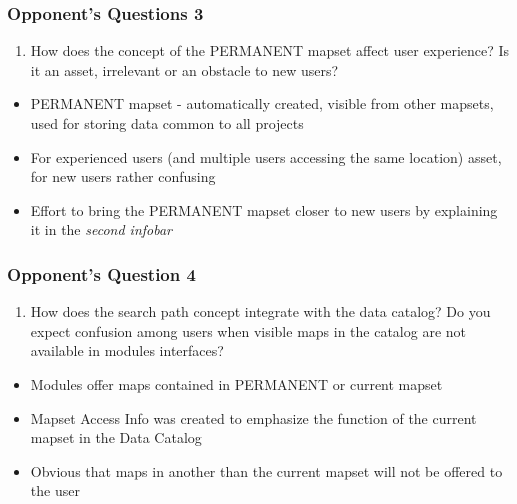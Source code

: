 \documentclass[aspectratio=169]{beamer}
\begin{document}
\begin{frame}
\frametitle{Opponent's Questions 3}
\begin{enumerate}\addtocounter{enumi}{2}
\item{How does the concept of the PERMANENT mapset affect user experience? Is it an asset, irrelevant or an obstacle to new users?}
\end{enumerate}
\begin{itemize}
\vspace{0.3cm}
\item{PERMANENT mapset - automatically created, visible from other mapsets, used for storing data common to all projects}
\item{For experienced users (and multiple users accessing the same location) asset, for new users rather confusing}
\item{Effort to bring the PERMANENT mapset closer to new users by explaining it in the \textit{second infobar}}
\end{itemize}
\end{frame}

\begin{frame}
\frametitle{Opponent's Question 4}
\begin{enumerate}\addtocounter{enumi}{3}
\item{How does the search path concept integrate with the data catalog? Do you expect confusion among users when visible maps in the catalog are not available in modules interfaces?}
\end{enumerate}
\begin{itemize}
\vspace{0.3cm}
\item{Modules offer maps contained in PERMANENT or current mapset}
\item{Mapset Access Info was created to emphasize the function of the current mapset in the Data Catalog}
\item{Obvious that maps in another than the current mapset will not be offered to the user} 
\end{itemize}
\end{frame}
\end{document}
